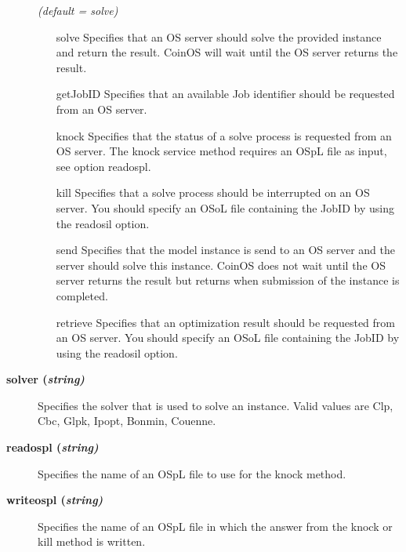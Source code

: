 \begin{description}
\textsl{(default = solve)}
\begin{itemize}
\item[solve] 
Specifies that an OS server should solve the provided instance and return the result.
CoinOS will wait until the OS server returns the result.
\item[getJobID] 
Specifies that an available Job identifier should be requested from an OS server.
\item[knock] 
Specifies that the status of a solve process is requested from an OS server.
The knock service method requires an OSpL file as input, see option readospl.
\item[kill] 
Specifies that a solve process should be interrupted on an OS server.
You should specify an OSoL file containing the JobID by using the readosil option.
\item[send] 
Specifies that the model instance is send to an OS server and the server should solve this instance.
CoinOS does not wait until the OS server returns the result but returns when submission of the instance is completed.
\item[retrieve] 
Specifies that an optimization result should be requested from an OS server.
You should specify an OSoL file containing the JobID by using the readosil option.
\end{itemize}

\item[\label{solver}\hypertarget{solver}
{\textbf{solver (\slshape{string})}}]\hspace{1.0in}

Specifies the solver that is used to solve an instance.
Valid values are Clp, Cbc, Glpk, Ipopt, Bonmin, Couenne.


\item[\label{readospl}\hypertarget{readospl}
{\textbf{readospl (\slshape{string})}}]\hspace{1.0in}

Specifies the name of an OSpL file to use for the knock method.


\item[\label{writeospl}\hypertarget{writeospl}
{\textbf{writeospl (\slshape{string})}}]\hspace{1.0in}

Specifies the name of an OSpL file in which the answer from the knock or kill method is written.

\end{description}
